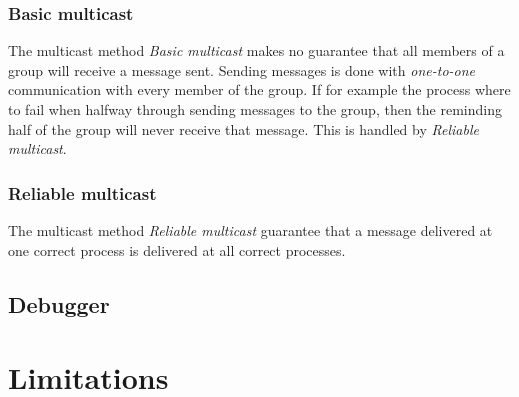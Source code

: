 \documentclass[titlepage, twocolumn, a4paper, 10pt]{article}
\begin{document}
\subsubsection{Basic multicast}\label{sec:basic-multicast}
The multicast method \textit{Basic multicast} makes no guarantee that
all members of a group will receive a message sent. Sending messages
is done with \textit{one-to-one} communication with every member of
the group. If for example the process where to fail when halfway
through sending messages to the group, then the reminding half of the
group will never receive that message. This is handled by
\textit{Reliable multicast}.

\subsubsection{Reliable multicast}\label{sec:reliable-multicast}
The multicast method \textit{Reliable multicast} guarantee that a
message delivered at one correct process is delivered at all correct
processes.

\subsection{Debugger}\label{sec:debugger}




\section{Limitations}\label{sec:limitations}

\end{document}
